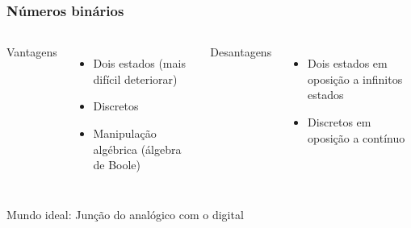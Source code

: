 \begin{frame}
	\frametitle{Números binários}
	\begin{columns}
			\par Vantagens
			\begin{itemize}
				\item Dois estados (mais difícil deteriorar)
				\item Discretos
				\item Manipulação algébrica (álgebra de Boole)
			\end{itemize}
			\par Desantagens
			\begin{itemize}
				\item Dois estados em oposição a infinitos estados
				\item Discretos em oposição a contínuo
			\end{itemize}
	\end{columns}
	\par Mundo ideal: Junção do analógico com o digital
\end{frame}


